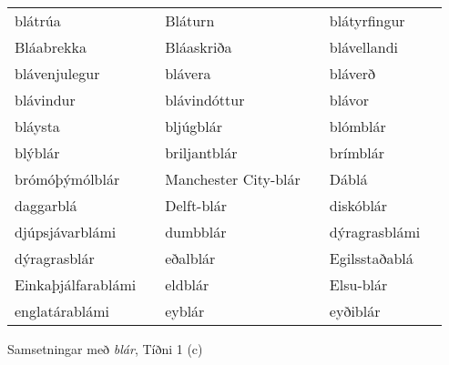 \documentclass[../samsetningasafn.tex]{subfiles}
\begin{document}
\begin{wordlist}[H]
\begin{tcolorbox}
\begin{tabular}{BlBlBl}
		blátrúa		&		& 
		Bláturn		&		& 
		blátyrfingur	&		\\  %
		Bláabrekka	&		& 
		Bláaskriða	&		& 
		blávellandi	&		\\  %
		blávenjulegur &		& 
		blávera		&		& 
		bláverð		&		\\  %
		blávindur	&		& 
		blávindóttur	&		& 
		blávor		&		\\  %
		bláysta		&		& 
		bljúgblár	&		& 
		blómblár	&		\\  %
		blýblár		&		& 
		briljantblár	&		& 
		brímblár		&		\\  %
		brómóþýmólblár & 	& 
		Manchester City-blár	& & 
		Dáblá		&		\\  %
		daggarblá	&		& 
		Delft-blár	&		& 
		diskóblár	&		\\  %
		djúpsjávarblámi &	& 
		dumbblár	&		& 
		dýragrasblámi &		\\  %
		dýragrasblár &		& 
		eðalblár		&		& 
		Egilsstaðablá	&	\\  %
		Einkaþjálfarablámi & 	& 
		eldblár		&		& 
		Elsu-blár	&		\\  %
		englatárablámi &		& 
		eyblár		&		& 
		eyðiblár		&		  %
	\end{tabular}
	
\end{tcolorbox}
	\caption{Samsetningar með \textit{blár}, Tíðni 1 (c)}
	\label{listi:blatt.1c}
\end{wordlist}			
	
\end{document}
